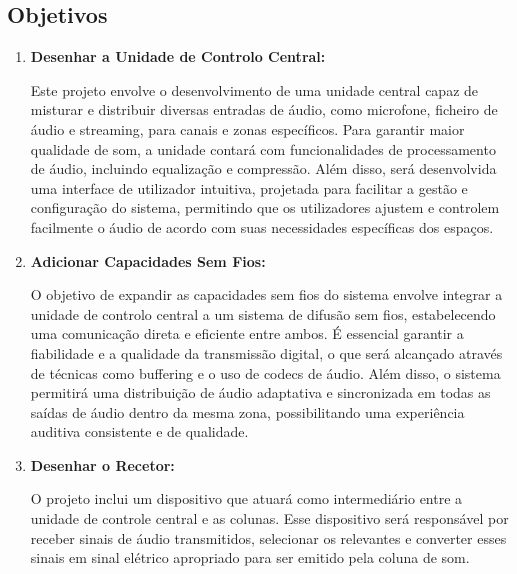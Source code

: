 \documentclass{article}
\begin{document}
\subsection{Objetivos}

\vspace{0.3cm}

\begin{enumerate}
\item \textbf{Desenhar a Unidade de Controlo Central:}
\begin{adjustwidth}{0.1cm}{0.1cm}
Este projeto envolve o desenvolvimento de uma unidade central capaz de misturar e distribuir diversas entradas de áudio, como microfone, ficheiro de áudio e streaming, para canais e zonas específicos. Para garantir maior qualidade de som, a unidade contará com funcionalidades de processamento de áudio, incluindo equalização e compressão. Além disso, será desenvolvida uma interface de utilizador intuitiva, projetada para facilitar a gestão e configuração do sistema, permitindo que os utilizadores ajustem e controlem facilmente o áudio de acordo com suas necessidades específicas dos espaços.
\end{adjustwidth}

    

\vspace{0.2cm}

\item \textbf{Adicionar Capacidades Sem Fios:}

\begin{adjustwidth}{0.1cm}{0.1cm}
O objetivo de expandir as capacidades sem fios do sistema envolve integrar a unidade de controlo central a um sistema de difusão sem fios, estabelecendo uma comunicação direta e eficiente entre ambos. É essencial garantir a fiabilidade e a qualidade da transmissão digital, o que será alcançado através de técnicas como buffering e o uso de codecs de áudio. Além disso, o sistema permitirá uma distribuição de áudio adaptativa e sincronizada em todas as saídas de áudio dentro da mesma zona, possibilitando uma experiência auditiva consistente e de qualidade.
\end{adjustwidth}

\vspace{0.2cm}

\item \textbf{Desenhar o Recetor:}

\begin{adjustwidth}{0.1cm}{0.1cm}
O projeto inclui um dispositivo que atuará como intermediário entre a unidade de controle central e as colunas. Esse dispositivo será responsável por receber sinais de áudio transmitidos, selecionar os relevantes e converter esses sinais em sinal elétrico apropriado para ser emitido pela coluna de som.
\end{adjustwidth}


\end{enumerate}
\end{document}

